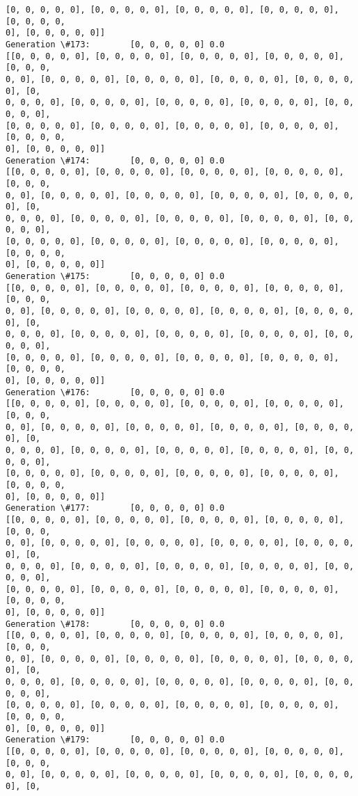 \documentclass[11pt]{article}
\begin{document}
\begin{Verbatim}[commandchars=\\\{\}]
[0, 0, 0, 0, 0], [0, 0, 0, 0, 0], [0, 0, 0, 0, 0], [0, 0, 0, 0, 0], [0, 0, 0, 0,
0], [0, 0, 0, 0, 0]]
Generation \#173:        [0, 0, 0, 0, 0] 0.0
[[0, 0, 0, 0, 0], [0, 0, 0, 0, 0], [0, 0, 0, 0, 0], [0, 0, 0, 0, 0], [0, 0, 0,
0, 0], [0, 0, 0, 0, 0], [0, 0, 0, 0, 0], [0, 0, 0, 0, 0], [0, 0, 0, 0, 0], [0,
0, 0, 0, 0], [0, 0, 0, 0, 0], [0, 0, 0, 0, 0], [0, 0, 0, 0, 0], [0, 0, 0, 0, 0],
[0, 0, 0, 0, 0], [0, 0, 0, 0, 0], [0, 0, 0, 0, 0], [0, 0, 0, 0, 0], [0, 0, 0, 0,
0], [0, 0, 0, 0, 0]]
Generation \#174:        [0, 0, 0, 0, 0] 0.0
[[0, 0, 0, 0, 0], [0, 0, 0, 0, 0], [0, 0, 0, 0, 0], [0, 0, 0, 0, 0], [0, 0, 0,
0, 0], [0, 0, 0, 0, 0], [0, 0, 0, 0, 0], [0, 0, 0, 0, 0], [0, 0, 0, 0, 0], [0,
0, 0, 0, 0], [0, 0, 0, 0, 0], [0, 0, 0, 0, 0], [0, 0, 0, 0, 0], [0, 0, 0, 0, 0],
[0, 0, 0, 0, 0], [0, 0, 0, 0, 0], [0, 0, 0, 0, 0], [0, 0, 0, 0, 0], [0, 0, 0, 0,
0], [0, 0, 0, 0, 0]]
Generation \#175:        [0, 0, 0, 0, 0] 0.0
[[0, 0, 0, 0, 0], [0, 0, 0, 0, 0], [0, 0, 0, 0, 0], [0, 0, 0, 0, 0], [0, 0, 0,
0, 0], [0, 0, 0, 0, 0], [0, 0, 0, 0, 0], [0, 0, 0, 0, 0], [0, 0, 0, 0, 0], [0,
0, 0, 0, 0], [0, 0, 0, 0, 0], [0, 0, 0, 0, 0], [0, 0, 0, 0, 0], [0, 0, 0, 0, 0],
[0, 0, 0, 0, 0], [0, 0, 0, 0, 0], [0, 0, 0, 0, 0], [0, 0, 0, 0, 0], [0, 0, 0, 0,
0], [0, 0, 0, 0, 0]]
Generation \#176:        [0, 0, 0, 0, 0] 0.0
[[0, 0, 0, 0, 0], [0, 0, 0, 0, 0], [0, 0, 0, 0, 0], [0, 0, 0, 0, 0], [0, 0, 0,
0, 0], [0, 0, 0, 0, 0], [0, 0, 0, 0, 0], [0, 0, 0, 0, 0], [0, 0, 0, 0, 0], [0,
0, 0, 0, 0], [0, 0, 0, 0, 0], [0, 0, 0, 0, 0], [0, 0, 0, 0, 0], [0, 0, 0, 0, 0],
[0, 0, 0, 0, 0], [0, 0, 0, 0, 0], [0, 0, 0, 0, 0], [0, 0, 0, 0, 0], [0, 0, 0, 0,
0], [0, 0, 0, 0, 0]]
Generation \#177:        [0, 0, 0, 0, 0] 0.0
[[0, 0, 0, 0, 0], [0, 0, 0, 0, 0], [0, 0, 0, 0, 0], [0, 0, 0, 0, 0], [0, 0, 0,
0, 0], [0, 0, 0, 0, 0], [0, 0, 0, 0, 0], [0, 0, 0, 0, 0], [0, 0, 0, 0, 0], [0,
0, 0, 0, 0], [0, 0, 0, 0, 0], [0, 0, 0, 0, 0], [0, 0, 0, 0, 0], [0, 0, 0, 0, 0],
[0, 0, 0, 0, 0], [0, 0, 0, 0, 0], [0, 0, 0, 0, 0], [0, 0, 0, 0, 0], [0, 0, 0, 0,
0], [0, 0, 0, 0, 0]]
Generation \#178:        [0, 0, 0, 0, 0] 0.0
[[0, 0, 0, 0, 0], [0, 0, 0, 0, 0], [0, 0, 0, 0, 0], [0, 0, 0, 0, 0], [0, 0, 0,
0, 0], [0, 0, 0, 0, 0], [0, 0, 0, 0, 0], [0, 0, 0, 0, 0], [0, 0, 0, 0, 0], [0,
0, 0, 0, 0], [0, 0, 0, 0, 0], [0, 0, 0, 0, 0], [0, 0, 0, 0, 0], [0, 0, 0, 0, 0],
[0, 0, 0, 0, 0], [0, 0, 0, 0, 0], [0, 0, 0, 0, 0], [0, 0, 0, 0, 0], [0, 0, 0, 0,
0], [0, 0, 0, 0, 0]]
Generation \#179:        [0, 0, 0, 0, 0] 0.0
[[0, 0, 0, 0, 0], [0, 0, 0, 0, 0], [0, 0, 0, 0, 0], [0, 0, 0, 0, 0], [0, 0, 0,
0, 0], [0, 0, 0, 0, 0], [0, 0, 0, 0, 0], [0, 0, 0, 0, 0], [0, 0, 0, 0, 0], [0,

\end{Verbatim}
\end{document}
